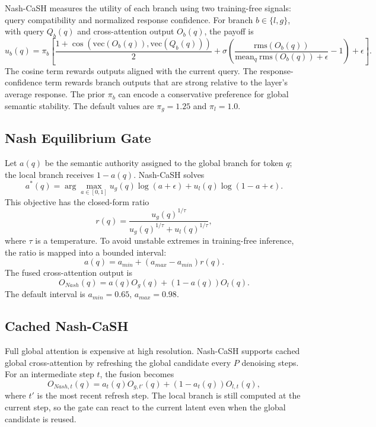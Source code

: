 Nash-CaSH measures the utility of each branch using two training-free signals: query compatibility and normalized response confidence.
For branch $b \in \{l,g\}$, with query $Q_b(q)$ and cross-attention output $O_b(q)$, the payoff is
\begin{equation}
u_b(q) =
\pi_b
\left[
\frac{1 + \cos(\mathrm{vec}(O_b(q)), \mathrm{vec}(Q_b(q)))}{2}
+
\sigma\left(
\frac{\mathrm{rms}(O_b(q))}{\mathrm{mean}_q\ \mathrm{rms}(O_b(q)) + \epsilon} - 1
\right)
+
\epsilon
\right].
\end{equation}
The cosine term rewards outputs aligned with the current query.
The response-confidence term rewards branch outputs that are strong relative to the layer's average response.
The prior $\pi_b$ can encode a conservative preference for global semantic stability.
The default values are $\pi_g=1.25$ and $\pi_l=1.0$.

\subsection{Nash Equilibrium Gate}

Let $a(q)$ be the semantic authority assigned to the global branch for token $q$; the local branch receives $1-a(q)$.
Nash-CaSH solves
\begin{equation}
a^*(q)
= \arg\max_{a \in [0,1]}
u_g(q) \log(a + \epsilon)
+ u_l(q) \log(1-a + \epsilon).
\end{equation}
This objective has the closed-form ratio
\begin{equation}
r(q)
=
\frac{u_g(q)^{1/\tau}}
{u_g(q)^{1/\tau} + u_l(q)^{1/\tau}},
\end{equation}
where $\tau$ is a temperature.
To avoid unstable extremes in training-free inference, the ratio is mapped into a bounded interval:
\begin{equation}
a(q) = a_{min} + (a_{max} - a_{min}) r(q).
\end{equation}
The fused cross-attention output is
\begin{equation}
O_{Nash}(q)
= a(q)O_g(q) + (1-a(q))O_l(q).
\end{equation}
The default interval is $a_{min}=0.65$, $a_{max}=0.98$.

\subsection{Cached Nash-CaSH}

Full global attention is expensive at high resolution.
Nash-CaSH supports cached global cross-attention by refreshing the global candidate every $P$ denoising steps.
For an intermediate step $t$, the fusion becomes
\begin{equation}
O_{Nash,t}(q)
= a_t(q)O_{g,t'}(q) + (1-a_t(q))O_{l,t}(q),
\end{equation}
where $t'$ is the most recent refresh step.
The local branch is still computed at the current step, so the gate can react to the current latent even when the global candidate is reused.

